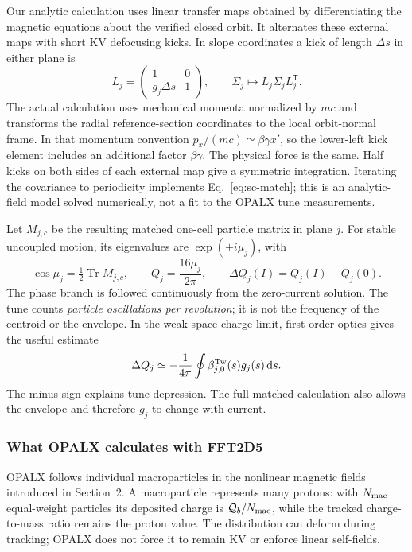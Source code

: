 Our analytic calculation uses linear transfer maps obtained by differentiating
the magnetic equations about the verified closed orbit. It alternates these
external maps with short KV defocusing kicks. In slope coordinates a kick of
length $\Delta s$ in either plane is
\begin{equation}
 L_j=\begin{pmatrix}1&0\\g_j\Delta s&1\end{pmatrix},\qquad
 \Sigma_j\longmapsto L_j\Sigma_jL_j^{\mathsf T}.
 \label{eq:sc-kick}
\end{equation}
The actual calculation uses mechanical momenta normalized by $mc$ and transforms
the radial reference-section coordinates to the local orbit-normal frame.
In that momentum convention $p_x/(mc)\simeq\beta\gamma x'$, so the lower-left
kick element includes an additional factor $\beta\gamma$. The physical force
is the same. Half kicks on both sides of each external map give a symmetric
integration. Iterating the covariance to periodicity implements
Eq.~\eqref{eq:sc-match}; this is an analytic-field model solved numerically,
not a fit to the OPALX tune measurements.

Let $M_{j,c}$ be the resulting matched one-cell particle matrix in plane $j$.
For stable uncoupled motion, its eigenvalues are $\exp(\pm i\mu_j)$, with
\begin{equation}
 \cos\mu_j=\tfrac12\operatorname{Tr}M_{j,c},\qquad
 Q_j=\frac{16\mu_j}{2\pi},\qquad
 \Delta Q_j(I)=Q_j(I)-Q_j(0).
 \label{eq:sc-tunes}
\end{equation}
The phase branch is followed continuously from the zero-current solution.
The tune counts \emph{particle oscillations per revolution}; it is not the
frequency of the centroid or the envelope. In the weak-space-charge limit,
first-order optics gives the useful estimate
\begin{equation}
 \Delta Q_j\simeq-\frac{1}{4\pi}
       \oint\beta_{j,0}^{\rm Tw}(s)g_j(s)\,\mathrm ds.
 \label{eq:sc-perturbation}
\end{equation}
The minus sign explains tune depression. The full matched calculation also
allows the envelope and therefore $g_j$ to change with current.



\subsubsection{What OPALX calculates with FFT2D5}
OPALX follows individual macroparticles in the nonlinear magnetic fields
introduced in Section~2. A macroparticle represents many protons: with
$N_{\rm mac}$ equal-weight particles its deposited charge is
$\mathcal Q_b/N_{\rm mac}$, while the tracked charge-to-mass ratio remains the
proton value. The distribution can deform during tracking; OPALX does not
force it to remain KV or enforce linear self-fields.

